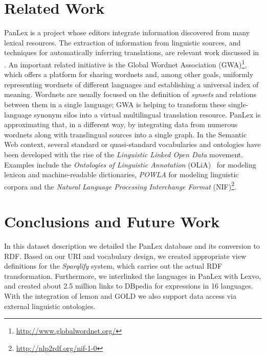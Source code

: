 \documentclass[sw]{iosart2c}
\begin{document}
\section{Related Work}
\label{sec:related}
PanLex is a project whose editors integrate information discovered from many lexical resources.
The extraction of information from linguistic sources, and techniques for automatically inferring translations,
are relevant work discussed in \cite{panlex_probtrans}.
An important related initiative is the Global Wordnet Association (GWA)\footnote{\url{http://www.globalwordnet.org/}},
which offers a platform for sharing wordnets and, among other goals, uniformly representing wordnets
of different languages and establishing a universal index of meaning.
Wordnets are usually focused on the
definition of \emph{synsets} and relations between them in a single language; GWA is helping to transform these single-language synonym silos into a virtual multilingual translation resource. PanLex is approximating that, in a different way, by integrating data from numerous wordnets along with translingual sources into a single graph.
In the Semantic Web context, several standard or quasi-standard vocabularies and ontologies have been developed with the rise of the \emph{Linguistic Linked Open Data} movement.
Examples include the
\emph{Ontologies of Linguistic Annotation} (OLiA)~\cite{olia2010} for modeling
lexicon and machine-readable dictionaries, \emph{POWLA} for modeling linguistic corpora\cite{powla2012} and the \emph{Natural Language Processing Interchange Format} (NIF)\footnote{\url{http://nlp2rdf.org/nif-1-0}}.

\section{Conclusions and Future Work}
\label{sec:conclusion}
In this dataset description we detailed the PanLex database and its conversion to RDF.
Based on our URI and vocabulary design, we created appropriate view definitions
for the \emph{Sparqlify} system, which carries out the actual RDF
transformation.
Furthermore, we interlinked the languages in PanLex with Lexvo, and created about 2.5 million links to DBpedia for expressions in 16 languages.
With the integration of lemon and GOLD we also support data access via external linguistic ontologies.
\end{document}
